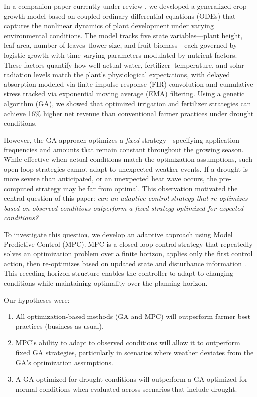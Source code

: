\documentclass[preprint,12pt]{elsarticle}
\begin{document}
In a companion paper currently under review \cite{becker2025ga}, we developed a generalized crop growth model based on coupled ordinary differential equations (ODEs) that captures the nonlinear dynamics of plant development under varying environmental conditions. The model tracks five state variables---plant height, leaf area, number of leaves, flower size, and fruit biomass---each governed by logistic growth with time-varying parameters modulated by nutrient factors. These factors quantify how well actual water, fertilizer, temperature, and solar radiation levels match the plant's physiological expectations, with delayed absorption modeled via finite impulse response (FIR) convolution and cumulative stress tracked via exponential moving average (EMA) filtering. Using a genetic algorithm (GA), we showed that optimized irrigation and fertilizer strategies can achieve 16\% higher net revenue than conventional farmer practices under drought conditions.

However, the GA approach optimizes a \emph{fixed} strategy---specifying application frequencies and amounts that remain constant throughout the growing season. While effective when actual conditions match the optimization assumptions, such open-loop strategies cannot adapt to unexpected weather events. If a drought is more severe than anticipated, or an unexpected heat wave occurs, the pre-computed strategy may be far from optimal. This observation motivated the central question of this paper: \emph{can an adaptive control strategy that re-optimizes based on observed conditions outperform a fixed strategy optimized for expected conditions?}

To investigate this question, we develop an adaptive approach using Model Predictive Control (MPC). MPC is a closed-loop control strategy that repeatedly solves an optimization problem over a finite horizon, applies only the first control action, then re-optimizes based on updated state and disturbance information \cite{rawlings2017mpc}. This receding-horizon structure enables the controller to adapt to changing conditions while maintaining optimality over the planning horizon.

Our hypotheses were:
\begin{enumerate}
\item All optimization-based methods (GA and MPC) will outperform farmer best practices (business as usual).
\item MPC's ability to adapt to observed conditions will allow it to outperform fixed GA strategies, particularly in scenarios where weather deviates from the GA's optimization assumptions.
\item A GA optimized for drought conditions will outperform a GA optimized for normal conditions when evaluated across scenarios that include drought.
\end{enumerate}
\end{document}
